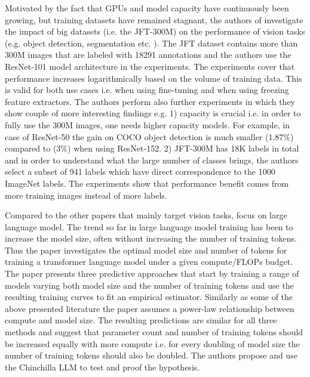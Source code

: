 \documentclass{article} %
\begin{document}
Motivated by the fact that GPUs and model capacity have continuously been growing, but training datasets have remained stagnant, the authors of \cite{sun2017revisiting} investigate the impact of big datasets (i.e. the JFT-300M) on the performance of vision tasks (e.g. object detection, segmentation etc. ). The JFT dataset contains more than 300M images that are labeled with 18291 annotations and the authors use the ResNet-101 model architecture in the experiments. The experiments cover that performance increases logarithmically based on the volume of training data. This is valid for both use cases i.e. when using fine-tuning and when using freezing feature extractors. The authors perform also further experiments in which they show couple of more interesting findings e.g. 1) capacity is crucial i.e. in order to fully use the 300M images, one needs higher capacity models. For example, in case of ResNet-50 the gain on COCO object detection is much smaller (1.87\%) compared to (3\%) when using ResNet-152. 2) JFT-300M has 18K labels in total and in order to understand what the large number of classes brings, the authors select a subset of 941 labels which have direct correspondence to the 1000 ImageNet labels. The experiments show that performance benefit comes from more training images instead of more labels.

Compared to the other papers that mainly target vision tasks, \cite{hoffmann2022training} focus on large language model. The trend so far in large language model training has been to increase the model size, often without increasing the number of training tokens. Thus the paper investigates the optimal model size and number of tokens for training a transformer language model under a given compute/FLOPs budget. The paper presents three predictive approaches that start by training a range of models varying both model size and the number of training tokens and use the resulting training curves to fit an empirical estimator. Similarly as some of the above presented literature the paper assumes a power-law relationship between compute and model size. The resulting predictions are similar for all three methods and suggest that parameter count and number of training tokens should be increased equally with more compute i.e. for every doubling of model size the number of training tokens should also be doubled. The authors propose and use the Chinchilla LLM to test and proof the hypothesis.
\end{document}

